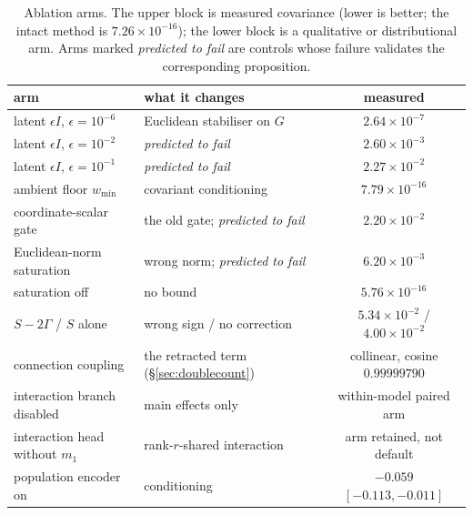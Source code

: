 \documentclass{article}
\begin{document}
\begin{table}[h]
\centering
\caption{Ablation arms. The upper block is measured covariance (lower is better; the intact
method is $7.26\times10^{-16}$); the lower block is a qualitative or distributional arm. Arms
marked \emph{predicted to fail} are controls whose failure validates the corresponding
proposition.}
\label{tab:ablations}
\begin{tabular}{llc}
\toprule
arm & what it changes & measured \\
\midrule
latent $\epsilon I$, $\epsilon = 10^{-6}$ & Euclidean stabiliser on $G$ & $2.64\times10^{-7}$ \\
latent $\epsilon I$, $\epsilon = 10^{-2}$ & \emph{predicted to fail} & $2.60\times10^{-3}$ \\
latent $\epsilon I$, $\epsilon = 10^{-1}$ & \emph{predicted to fail} & $2.27\times10^{-2}$ \\
ambient floor $w_{\min}$ & covariant conditioning & $7.79\times10^{-16}$ \\
coordinate-scalar gate & the old gate; \emph{predicted to fail} & $2.20\times10^{-2}$ \\
Euclidean-norm saturation & wrong norm; \emph{predicted to fail} & $6.20\times10^{-3}$ \\
saturation off & no bound & $5.76\times10^{-16}$ \\
$S - 2\Gamma$ / $S$ alone & wrong sign / no correction & $5.34\times10^{-2}$ / $4.00\times10^{-2}$ \\
\midrule
connection coupling & the retracted term (\S\ref{sec:doublecount}) & collinear, cosine $0.99999790$ \\
interaction branch disabled & main effects only & within-model paired arm \\
interaction head without $m_{1}$ & rank-$r$-shared interaction & arm retained, not default \\
population encoder on & \citet{atanackovic2024mfm} conditioning & $-0.059$ $[-0.113, -0.011]$ \\
\bottomrule
\end{tabular}
\end{table}
\end{document}
